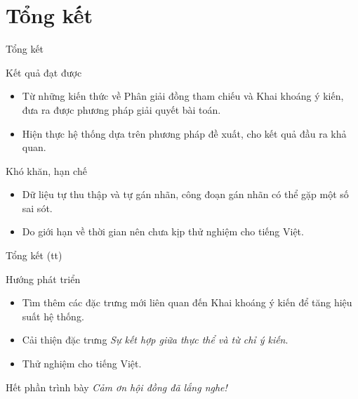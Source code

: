\documentclass[9pt,xcolor=table,hyperref=unicode]{beamer}
\begin{document}
	\section{Tổng kết}
		\begin{frame}{Tổng kết}			
			\begin{block}{Kết quả đạt được}
				\begin{itemize}
					\itemsep0.8em
					\item Từ những kiến thức về Phân giải đồng tham chiếu và Khai khoáng ý kiến, đưa ra được phương pháp giải quyết bài toán.
					\item Hiện thực hệ thống dựa trên phương pháp đề xuất, cho kết quả đầu ra khả quan.				
				\end{itemize}
			\end{block}
			\begin{block}{Khó khăn, hạn chế}
				\begin{itemize}
					\itemsep0.8em
					\item Dữ liệu tự thu thập và tự gán nhãn, công đoạn gán nhãn có thể gặp một số sai sót. 
					\item Do giới hạn về thời gian nên chưa kịp thử nghiệm cho tiếng Việt.				
				\end{itemize}
			\end{block}
		\end{frame}
	
		\begin{frame}{Tổng kết (tt)}			
			\begin{block}{Hướng phát triển}
				\begin{itemize}
					\itemsep0.8em
					\item Tìm thêm các đặc trưng mới liên quan đến Khai khoáng ý kiến để tăng hiệu suất hệ thống.
					\item Cải thiện đặc trưng \textit{Sự kết hợp giữa thực thể và từ chỉ ý kiến}.
					\item Thử nghiệm cho tiếng Việt.
				\end{itemize}
			\end{block}
		\end{frame}

		\begin{frame}{Hết phần trình bày}
			\Huge
			\centering
			\fontsize{35pt}{35}\selectfont
			\textit{Cảm ơn hội đồng đã lắng nghe!}			
		\end{frame}
\end{document}

